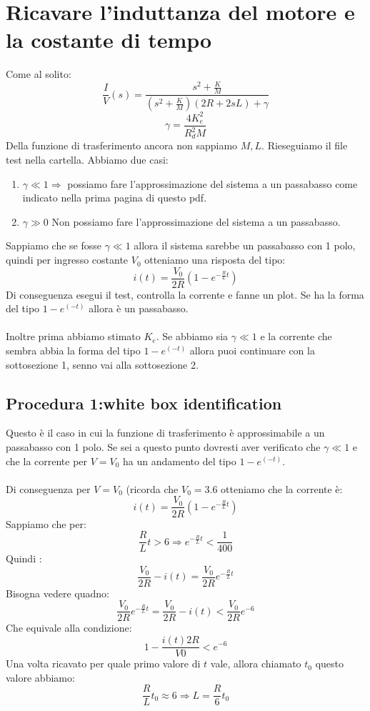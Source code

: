 \documentclass[10pt,a4paper]{article}
\begin{document}
\section{Ricavare l'induttanza del motore e la costante di tempo}
Come al solito:
$$\frac{I}{V}(s) = \frac{s^2+\frac{K}{M}}{(s^2+\frac{K}{M})(2R+2sL)+\gamma }$$
$$\gamma = \frac{4K_e^2}{R_d^2M}$$
Della funzione di trasferimento ancora non sappiamo $M,L$. Rieseguiamo il file test nella cartella. Abbiamo due casi:
\begin{enumerate}
\item $\gamma \ll 1 \Rightarrow$ possiamo fare l'approssimazione del sistema a un passabasso come indicato nella prima pagina di questo pdf.
\item $\gamma \gg 0$ Non possiamo fare l'approssimazione del sistema a un passabasso.
\end{enumerate}
Sappiamo che se fosse $\gamma \ll 1$ allora il sistema sarebbe un passabasso con 1 polo, quindi per ingresso costante $V_0$ otteniamo una risposta del tipo:
$$i(t) = \frac{V_0}{2R}(1-e^{-\frac{R}{L}t})$$
Di conseguenza esegui il test, controlla la corrente e fanne un plot. Se ha la forma del tipo $1-e^(-t)$ allora è un passabasso. \\ \\

Inoltre prima abbiamo stimato $K_e$. Se abbiamo sia $\gamma \ll 1 $ e la corrente che sembra abbia la forma del tipo $1-e^(-t)$ allora puoi continuare con la sottosezione 1, senno vai alla sottosezione 2.
\subsection{Procedura 1:white box identification}
Questo è il caso in cui la funzione di trasferimento è approssimabile a un passabasso con 1 polo. Se sei a questo punto dovresti aver verificato che $\gamma \ll 1$ e che la corrente per $V=V_0$ ha un andamento del tipo $1-e^(-t)$. \\  \\
Di conseguenza per $V=V_0$ (ricorda che $V_0=3.6$ otteniamo che la corrente è:
$$i(t) = \frac{V_0}{2R}(1-e^{-\frac{R}{L}t})$$
Sappiamo che per:
$$\frac{R}{L}t > 6 \Rightarrow e^{-\frac{R}{L}t} < \frac{1}{400}$$
Quindi :
$$\frac{V_0}{2R} - i(t) = \frac{V_0}{2R}e^{-\frac{R}{L}t}$$
Bisogna vedere quadno:
$$\frac{V_0}{2R}e^{-\frac{R}{L}t}= \frac{V_0}{2R} - i(t) < \frac{V_0}{2R}e^{-6}$$
Che equivale alla condizione:
$$1- \frac{i(t)2R}{V0} < e^{-6}$$
Una volta ricavato per quale primo valore di $t$ vale, allora chiamato $t_0$ questo valore abbiamo:
$$\frac{R}{L}t_0 \approx 6 \Rightarrow L = \frac{R}{6}t_0$$\\ \\
\end{document}
